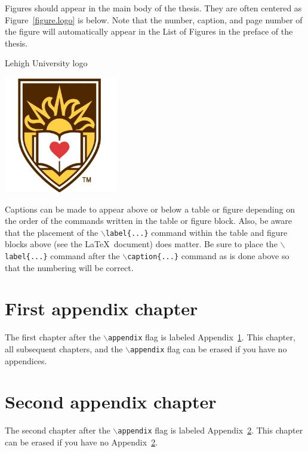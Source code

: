 \documentclass[11pt]{report}
\begin{document}
Figures should appear in the main body of the thesis.  They are often centered as Figure~\ref{figure.logo} is below.  Note that the number, caption, and page number of the figure will automatically appear in the List of Figures in the preface of the thesis.

\bfigure[h]
  \centering
  \caption{Lehigh University logo}
  \label{figure.logo}
  \includegraphics[height=2in]{images/lehigh}
\efigure

Captions can be made to appear above or below a table or figure depending on the order of the commands written in the table or figure block.  Also, be aware that the placement of the \texttt{$\backslash$label\{...\}} command within the table and figure blocks above (see the \LaTeX\ document) does matter.  Be sure to place the \texttt{$\backslash$label\{...\}} command after the \texttt{$\backslash$caption\{...\}} command as is done above so that the numbering will be correct.




\appendix
\chapter{First appendix chapter}\label{appendix.first}

The first chapter after the \texttt{$\backslash$appendix} flag is labeled Appendix~\ref{appendix.first}.  This chapter, all subsequent chapters, and the \texttt{$\backslash$appendix} flag can be erased if you have no appendices.

\chapter{Second appendix chapter}\label{appendix.second}

The second chapter after the \texttt{$\backslash$appendix} flag is labeled Appendix~\ref{appendix.second}.  This chapter can be erased if you have no Appendix~\ref{appendix.second}.

\end{document}
